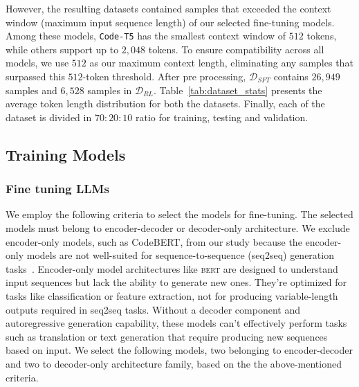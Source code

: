 However, the resulting datasets contained samples that exceeded the context window (maximum input sequence length) of our selected fine-tuning models.
Among these models, \texttt{Code-T5} has the smallest context window of $512$ tokens, while others support up to $2,048$ tokens. To ensure compatibility across all models, we use $512$ as our maximum context length, eliminating any samples that surpassed this $512$-token threshold. After pre processing, $\mathcal{D}_{SFT}$ contains $26,949$ samples and $6,528$ samples in $\mathcal{D}_{RL}$. 
Table~\ref{tab:dataset_stats} presents the average token length distribution for both the datasets. Finally, each of the dataset is divided in $70:20:10$ ratio for training, testing and validation.

\subsection{Training Models}



\subsubsection{Fine tuning LLMs}

We employ the following criteria to select the models for fine-tuning.
The selected models must belong to encoder-decoder or decoder-only architecture.
We exclude encoder-only models, such as CodeBERT, from our study because the encoder-only models are not well-suited for sequence-to-sequence (seq2seq) generation tasks~\cite{wang2023codet5+}.
Encoder-only model architectures like \textsc{bert} are designed to understand input sequences but lack the ability to generate new ones. They're optimized for tasks like classification or feature extraction, not for producing variable-length outputs required in seq2seq tasks. Without a decoder component and autoregressive generation capability, these models can't effectively perform tasks such as translation or text generation that require producing new sequences based on input.
We select the following models, two belonging to encoder-decoder and two to decoder-only architecture family,
based on the the above-mentioned criteria.

